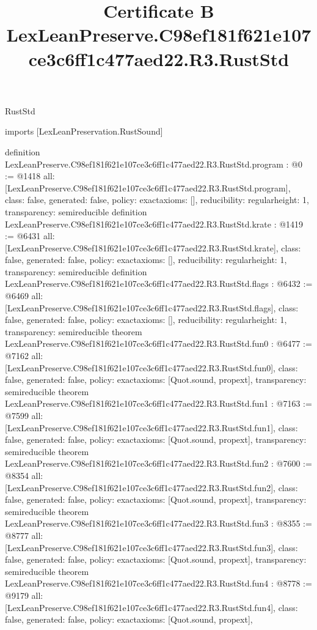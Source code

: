 \begin{lexlean}{RustStd}
\title{Certificate B LexLeanPreserve.C98ef181f621e107ce3c6ff1c477aed22.R3.RustStd}
\begin{coremodule}
imports [LexLeanPreservation.RustSound]

definition LexLeanPreserve.C98ef181f621e107ce3c6ff1c477aed22.R3.RustStd.program : @0 := @1418 {
  all: [LexLeanPreserve.C98ef181f621e107ce3c6ff1c477aed22.R3.RustStd.program],
  class: false,
  generated: false,
  policy: exact{axioms: []},
  reducibility: regular{height: 1},
  transparency: semireducible
}
definition LexLeanPreserve.C98ef181f621e107ce3c6ff1c477aed22.R3.RustStd.krate : @1419 := @6431 {
  all: [LexLeanPreserve.C98ef181f621e107ce3c6ff1c477aed22.R3.RustStd.krate],
  class: false,
  generated: false,
  policy: exact{axioms: []},
  reducibility: regular{height: 1},
  transparency: semireducible
}
definition LexLeanPreserve.C98ef181f621e107ce3c6ff1c477aed22.R3.RustStd.flags : @6432 := @6469 {
  all: [LexLeanPreserve.C98ef181f621e107ce3c6ff1c477aed22.R3.RustStd.flags],
  class: false,
  generated: false,
  policy: exact{axioms: []},
  reducibility: regular{height: 1},
  transparency: semireducible
}
theorem LexLeanPreserve.C98ef181f621e107ce3c6ff1c477aed22.R3.RustStd.fun0 : @6477 := @7162 {
  all: [LexLeanPreserve.C98ef181f621e107ce3c6ff1c477aed22.R3.RustStd.fun0],
  class: false,
  generated: false,
  policy: exact{axioms: [Quot.sound, propext]},
  transparency: semireducible
}
theorem LexLeanPreserve.C98ef181f621e107ce3c6ff1c477aed22.R3.RustStd.fun1 : @7163 := @7599 {
  all: [LexLeanPreserve.C98ef181f621e107ce3c6ff1c477aed22.R3.RustStd.fun1],
  class: false,
  generated: false,
  policy: exact{axioms: [Quot.sound, propext]},
  transparency: semireducible
}
theorem LexLeanPreserve.C98ef181f621e107ce3c6ff1c477aed22.R3.RustStd.fun2 : @7600 := @8354 {
  all: [LexLeanPreserve.C98ef181f621e107ce3c6ff1c477aed22.R3.RustStd.fun2],
  class: false,
  generated: false,
  policy: exact{axioms: [Quot.sound, propext]},
  transparency: semireducible
}
theorem LexLeanPreserve.C98ef181f621e107ce3c6ff1c477aed22.R3.RustStd.fun3 : @8355 := @8777 {
  all: [LexLeanPreserve.C98ef181f621e107ce3c6ff1c477aed22.R3.RustStd.fun3],
  class: false,
  generated: false,
  policy: exact{axioms: [Quot.sound, propext]},
  transparency: semireducible
}
theorem LexLeanPreserve.C98ef181f621e107ce3c6ff1c477aed22.R3.RustStd.fun4 : @8778 := @9179 {
  all: [LexLeanPreserve.C98ef181f621e107ce3c6ff1c477aed22.R3.RustStd.fun4],
  class: false,
  generated: false,
  policy: exact{axioms: [Quot.sound, propext]},
}
\end{coremodule}
\end{lexlean}

